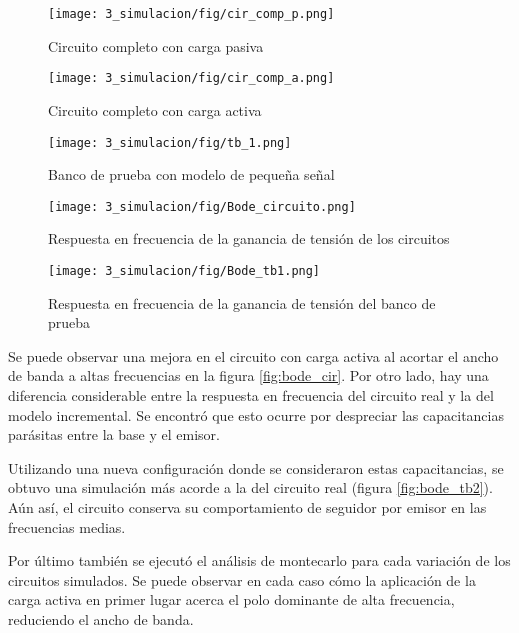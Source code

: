 \begin{figure}[ht]
    \begin{minipage}[t]{0.45\textwidth}
        \centering
        \texttt{[image: 3\_simulacion/fig/cir\_comp\_p.png]}
        \caption{Circuito completo con carga pasiva}
    \end{minipage}\hfill
    \begin{minipage}[t]{0.45\textwidth}
        \centering
        \texttt{[image: 3\_simulacion/fig/cir\_comp\_a.png]}
        \caption{Circuito completo con carga activa}
    \end{minipage}
\end{figure}

\begin{figure}[ht]
    \centering
    \texttt{[image: 3\_simulacion/fig/tb\_1.png]}
    \caption{Banco de prueba con modelo de pequeña señal}
\end{figure}

\begin{figure}[ht]
    \begin{minipage}[t]{0.48\textwidth}
        \centering
        \texttt{[image: 3\_simulacion/fig/Bode\_circuito.png]}
        \caption{Respuesta en frecuencia de la ganancia de tensión de los circuitos}
        \label{fig:bode_cir}
    \end{minipage}\hfill
    \begin{minipage}[t]{0.48\textwidth}
        \centering
        \texttt{[image: 3\_simulacion/fig/Bode\_tb1.png]}
        \caption{Respuesta en frecuencia de la ganancia de tensión del banco de prueba}
        \label{fig:bode_tb1}
    \end{minipage}
\end{figure}

Se puede observar una mejora en el circuito con carga activa al acortar el ancho de banda a altas frecuencias en la figura \ref{fig:bode_cir}. Por otro lado, hay una diferencia considerable entre la respuesta en frecuencia del circuito real y la del modelo incremental. Se encontró que esto ocurre por despreciar las capacitancias parásitas entre la base y el emisor.

Utilizando una nueva configuración donde se consideraron estas capacitancias, se obtuvo una simulación más acorde a la del circuito real (figura \ref{fig:bode_tb2}). Aún así, el circuito conserva su comportamiento de seguidor por emisor en las frecuencias medias.

Por último también se ejecutó el análisis de montecarlo para cada variación de los circuitos simulados. Se puede observar en cada caso cómo la aplicación de la carga activa en primer lugar acerca el polo dominante de alta frecuencia, reduciendo el ancho de banda.


